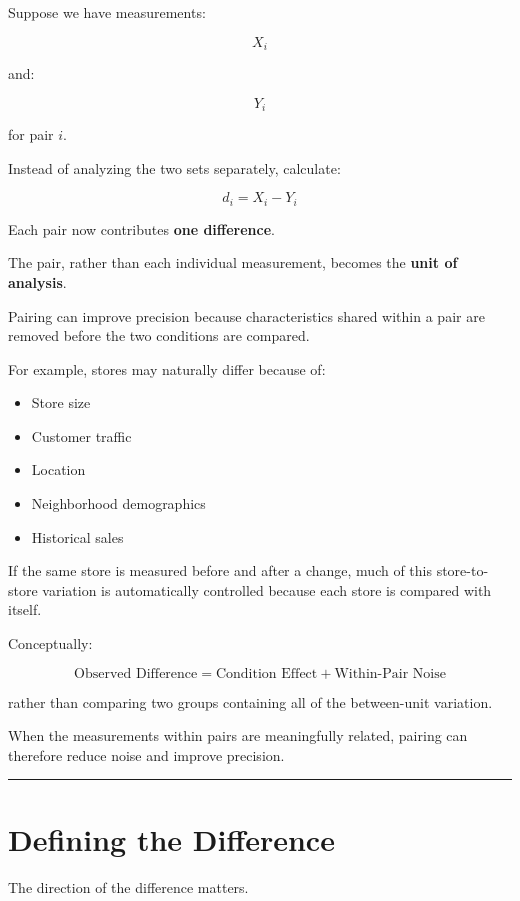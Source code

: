 \documentclass[
  letterpaper,
  DIV=11,
  numbers=noendperiod]{scrreprt}
\providecommand{\tightlist}{%
  \setlength{\itemsep}{0pt}\setlength{\parskip}{0pt}}
\begin{document}
Suppose we have measurements:

\[
X_i
\]

and:

\[
Y_i
\]

for pair \(i\).

Instead of analyzing the two sets separately, calculate:

\[
d_i=X_i-Y_i
\]

Each pair now contributes \textbf{one difference}.

The pair, rather than each individual measurement, becomes the
\textbf{unit of analysis}.

Pairing can improve precision because characteristics shared within a
pair are removed before the two conditions are compared.

For example, stores may naturally differ because of:

\begin{itemize}
\tightlist
\item
  Store size
\item
  Customer traffic
\item
  Location
\item
  Neighborhood demographics
\item
  Historical sales
\end{itemize}

If the same store is measured before and after a change, much of this
store-to-store variation is automatically controlled because each store
is compared with itself.

Conceptually:

\[
\text{Observed Difference}
=
\text{Condition Effect}
+
\text{Within-Pair Noise}
\]

rather than comparing two groups containing all of the between-unit
variation.

When the measurements within pairs are meaningfully related, pairing can
therefore reduce noise and improve precision.

\begin{center}\rule{0.5\linewidth}{0.5pt}\end{center}


\chapter{Defining the Difference}\label{defining-the-difference}

The direction of the difference matters.
\end{document}
